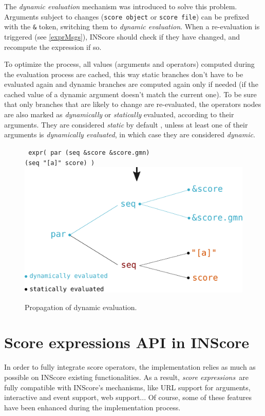 \documentclass{article}
\newcommand{\OSC}[1]{\texttt{#1}}
\newcommand{\oper}[1]{\textcolor{figRed}{#1}}
\newcommand{\param}[1]{\textcolor{figOrange}{#1}}
\newcommand{\prefix}[1]{\textcolor{figBlue}{#1}}
\newcommand{\sExpr}{\emph{score expressions}}
\newcommand{\tab}{\hspace*{4mm}}
\begin{document}
The \emph{dynamic evaluation} mechanism was introduced to solve this problem. Arguments subject to changes (\OSC{score object} or \OSC{score file}) can be prefixed with the \OSC{\&} token, switching them to \emph{dynamic evaluation}. When a re-evaluation is triggered (see \ref{exprMsgs}), INScore should check if they have changed, and recompute the expression if so.

To optimize the process, all values (arguments and operators) computed during the evaluation process are cached, this way static branches don't have to be evaluated again and dynamic branches are computed again only if needed (if the cached value of a dynamic argument doesn't match the current one). To be sure that only branches that are likely to change are re-evaluated, the operators nodes are also marked as \emph{dynamically} or \emph{statically} evaluated, according to their arguments. They are considered \emph{static} by default 
, unless at least one of their arguments is \emph{dynamically evaluated}, in which case they are considered \emph{dynamic}.

\begin{figure}[th]
\centering
\OSC{ expr( \oper{par} (\oper{seq} \prefix{\&}\param{score} \prefix{\&}\param{score.gmn}) \\
 \tab\tab\tab\tab (\oper{seq} \param{"[a]" score}) )}
\includegraphics[width=1\columnwidth]{imgs/dynamicEval}
\caption{Propagation of dynamic evaluation.
\label{fig:dynamicEval}}
\end{figure}



\section{Score expressions API in INScore}
\label{exprAPI}
In order to fully integrate score operators, the implementation relies as much as possible on INScore existing functionalities. As a result, \sExpr\ are fully compatible with INScore's mechanisms, like URL support for arguments, interactive and event support,  web support... Of course, some of these features have been enhanced during the implementation process.
\end{document}
